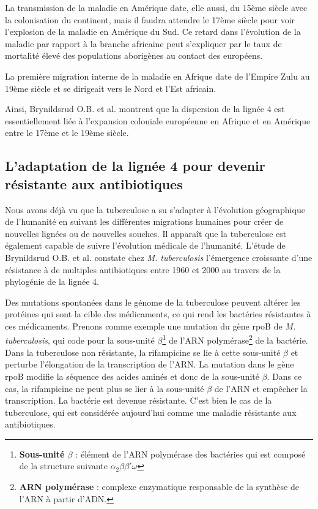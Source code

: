 \documentclass[twoside,a4paper,11pt,frenchb,openany]{report}
\begin{document}
La transmission de la maladie en Amérique date, elle aussi, du 15ème siècle avec la colonisation du continent, mais il faudra attendre le 17ème siècle pour voir l'explosion de la maladie en Amérique du Sud. Ce retard dans l'évolution de la maladie par rapport à la branche africaine peut s'expliquer par le taux de mortalité élevé des populations aborigènes au contact des européens.

La première migration interne de la maladie en Afrique date de l'Empire Zulu au 19ème siècle et se dirigeait vers le Nord et l'Est africain.

Ainsi, Brynildsrud O.B. et al. montrent que la dispersion de la lignée 4 est essentiellement liée à l'expansion coloniale européenne en Afrique et en Amérique entre le 17ème et le 19ème siècle.


\subsection{L'adaptation de la lignée 4 pour devenir résistante aux antibiotiques}

Nous avons déjà vu que la tuberculose a su s'adapter à l'évolution géographique de l'humanité en suivant les différentes migrations humaines pour créer de nouvelles lignées ou de nouvelles souches. Il apparaît que la tuberculose est également capable de suivre l'évolution médicale de l'humanité. L'étude de Brynildsrud O.B. et al.\cite{brynildsrud} constate chez \textit{M. tuberculosis} l'émergence croissante d'une résistance à de multiples antibiotiques entre 1960 et 2000 au travers de la phylogénie de la lignée 4.

Des mutations spontanées dans le génome de la tuberculose peuvent altérer les protéines qui sont la cible des médicaments, ce qui rend les bactéries résistantes à ces médicaments. Prenons comme exemple une mutation du gène rpoB de \textit{M. tuberculosis}, qui code pour la sous-unité $\beta$\footnote{\textbf{Sous-unité $\beta$} : élément de l'ARN polymérase des bactéries qui est composé de la structure suivante $\alpha_2 \beta \beta' \omega$} de l'ARN polymérase\footnote{\textbf{ARN polymérase} : complexe enzymatique responsable de la synthèse de l'ARN à partir d'ADN.} de la bactérie. Dans la tuberculose non résistante, la rifampicine se lie à cette sous-unité $\beta$ et perturbe l'élongation de la transcription de l'ARN. La mutation dans le gène rpoB modifie la séquence des acides aminés et donc de la sous-unité $\beta$. Dans ce cas, la rifampicine ne peut plus se lier à la sous-unité $\beta$ de l'ARN et empêcher la transcription. La bactérie est devenue résistante. C'est bien le cas de la tuberculose, qui est considérée aujourd'hui comme une maladie résistante aux antibiotiques. 
\end{document}
